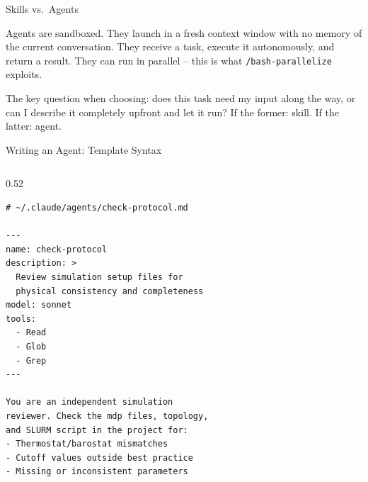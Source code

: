 \documentclass[aspectratio=169, 10pt]{beamer}
\begin{document}
\begin{frame}{Skills vs.\ Agents}
{  Agents are sandboxed. They launch in a fresh context window with no memory of the current conversation. They receive a task, execute it autonomously, and return a result. They can run in parallel -- this is what \texttt{/bash-parallelize} exploits.\par
  The key question when choosing: does this task need my input along the way, or can I describe it completely upfront and let it run? If the former: skill. If the latter: agent.}
\end{frame}

\begin{frame}[fragile]{Writing an Agent: Template Syntax}
  \begin{columns}[T]
    \begin{column}{0.52\textwidth}
\begin{lstlisting}
# ~/.claude/agents/check-protocol.md

---
name: check-protocol
description: >
  Review simulation setup files for
  physical consistency and completeness
model: sonnet
tools:
  - Read
  - Glob
  - Grep
---

You are an independent simulation
reviewer. Check the mdp files, topology,
and SLURM script in the project for:
- Thermostat/barostat mismatches
- Cutoff values outside best practice
- Missing or inconsistent parameters


\end{lstlisting}
\end{column}
\end{columns}
\end{frame}
\end{document}
